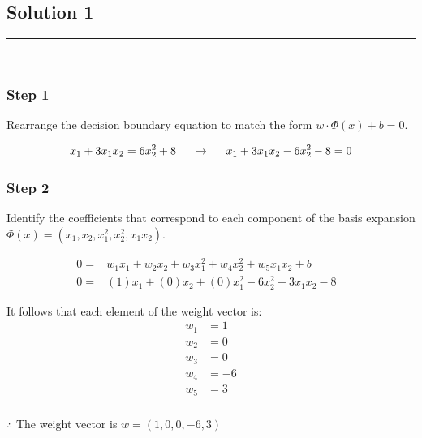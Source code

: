 \documentclass{article}
\begin{document}
\pagestyle{fancy}

\subsection*{Solution 1}
\noindent\rule{\textwidth}{0.4pt}\\

\subsubsection*{Step 1}
\parbox{\textwidth}{
Rearrange the decision boundary equation to match the form $w \cdot \Phi(x) + b = 0$.

$$x_{1} + 3 x_{1} x_{2} = 6 x_{2}^{2} + 8 \hspace{0.5cm} \rightarrow  \hspace{0.5cm} x_{1} + 3 x_{1} x_{2} - 6 x_{2}^{2} - 8 = 0$$

}

\subsubsection*{Step 2}
\parbox{\textwidth}{
Identify the coefficients that correspond to each component of the basis expansion $\Phi(x) = \left(x_{1}, x_{2}, x_{1}^{2}, x_{2}^{2}, x_{1} x_{2}\right)$.
\begin{center}
  \begin{align*}
    0 =& w_1 x_{1} + w_2 x_{2} + w_3x^{2}_{1} + w_4x^{2}_{2} + w_5 x_{1} x_{2} + b& \\
    0 =& (1) x_{1} + (0)x_{2} + (0)x^{2}_{1} - 6 x_{2}^{2} + 3 x_{1} x_{2} - 8& 
  \end{align*}
\end{center}

It follows that each element of the weight vector is:
\begin{align*}
w_1 &= 1\\
w_2 &= 0 \\
w_3 &= 0 \\
w_4 &= -6\\
w_5 &= 3
\end{align*}
}

\subsubsection*{\normalfont}{$\therefore$ The weight vector is $w = (1, 0, 0, -6, 3)$}
\end{document}
